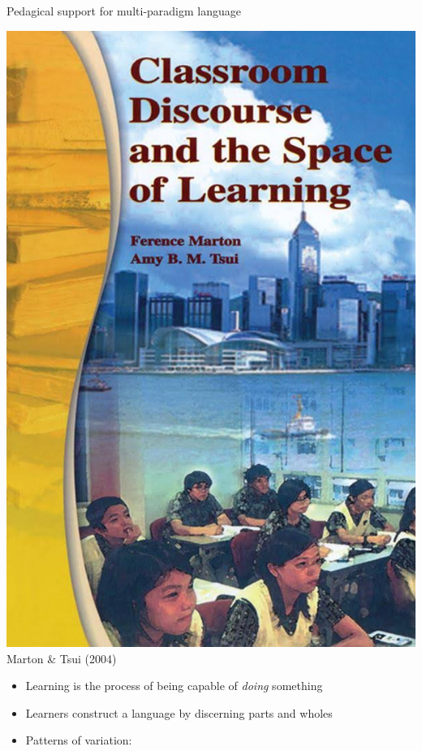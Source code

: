 \documentclass[aspectratio=169]{beamer}
\newenvironment{Slide}[1]%
  {\begin{frame}[environment=Slide]{#1}}
  {\end{frame}}%
\begin{document}
\begin{Slide}{Pedagical support for multi-paradigm language}
\begin{minipage}{0.2\textwidth}
  \includegraphics[height=0.52\textheight]{Pictures/marton}\\
  {\small Marton \& Tsui \newline (2004)}
\end{minipage}%
\begin{minipage}{0.85\textwidth}
  \begin{itemize}
    \item Learning is the process of being capable of \textit{doing} something
    \item Learners construct a language by discerning parts and wholes %
    \item Patterns of variation:

\end{itemize}
\end{minipage}
\end{Slide}
\end{document}
